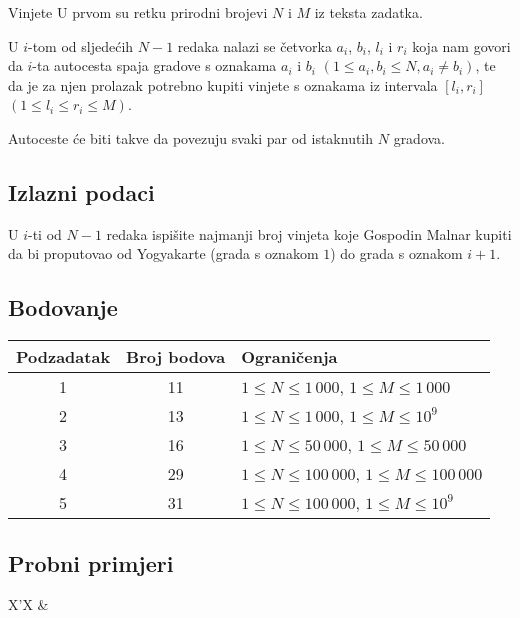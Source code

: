 \begin{statement}[
  problempoints=100,
  timelimit=3 sekunde,
  memorylimit=512 MiB,
]{Vinjete}
U prvom su retku prirodni brojevi $N$ i $M$ iz teksta zadatka.

U $i$-tom od sljedećih $N-1$ redaka nalazi se četvorka $a_i$, $b_i$, $l_i$ i
$r_i$ koja nam govori da $i$-ta autocesta spaja gradove s oznakama $a_i$ i
$b_i$ $(1 \le a_i, b_i \le N, a_i \ne b_i)$, te da je za njen prolazak
potrebno kupiti vinjete s oznakama iz intervala $[l_i, r_i]$ $(1 \le l_i \le
r_i \le M)$.

Autoceste će biti takve da povezuju svaki par od istaknutih $N$ gradova.

\subsection*{Izlazni podaci}

U $i$-ti od $N - 1$ redaka ispišite najmanji broj vinjeta koje Gospodin Malnar
kupiti da bi proputovao od Yogyakarte (grada s oznakom $1$) do grada s
oznakom $i+1$.

\subsection*{Bodovanje}

{\renewcommand{\arraystretch}{1.4}
  \setlength{\tabcolsep}{6pt}
  \begin{tabular}{ccl}
   Podzadatak & Broj bodova & Ograničenja \\ \midrule
    1 & 11 & $1 \le N \le 1\,000$, $1 \le M \le 1\,000$ \\
    2 & 13 & $1 \le N \le 1\,000$, $1 \le M \le 10^9$ \\
    3 & 16 & $1 \le N \le 50\,000$, $1 \le M \le 50\,000$\\
    4 & 29 & $1 \le N \le 100\,000$, $1 \le M \le 100\,000$\\
    5 & 31 & $1 \le N \le 100\,000$, $1 \le M \le 10^9$
\end{tabular}}

\subsection*{Probni primjeri}
\begin{tabularx}{\textwidth}{X'X}
 &
\end{tabularx}


\end{statement}
